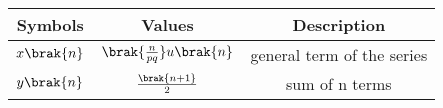 \begin{tabular}{|c|c|c|}
    \hline
    \textbf{Symbols} & \textbf{Values} & \textbf{Description} \\
    \hline
    $x\brak{n}$ & $\brak{\frac{n}{pq}}u\brak{n}$ & general term of the series \\
    \hline
    $y\brak{n}$ & $ \frac{\brak{n+1}}{2}$ & sum of n terms \\
    \hline
\end{tabular}
